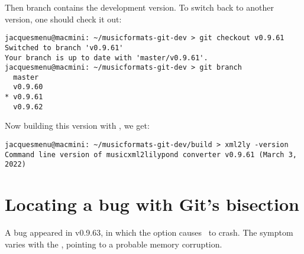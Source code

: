 Then  branch contains the development version. To switch back to another version, one should check it out:
\begin{lstlisting}[language=Terminal]
jacquesmenu@macmini: ~/musicformats-git-dev > git checkout v0.9.61
Switched to branch 'v0.9.61'
Your branch is up to date with 'master/v0.9.61'.
jacquesmenu@macmini: ~/musicformats-git-dev > git branch
  master
  v0.9.60
* v0.9.61
  v0.9.62
\end{lstlisting}

Now building this version with , we get:
\begin{lstlisting}[language=Terminal]
jacquesmenu@macmini: ~/musicformats-git-dev/build > xml2ly -version
Command line version of musicxml2lilypond converter v0.9.61 (March 3, 2022)
\end{lstlisting}


\chapter{Locating a bug with Git's bisection}

A bug appeared in v0.9.63, in which the  option causes \xmlToLy\ to crash.
The symptom varies with the \OS, pointing to a probable memory corruption.

